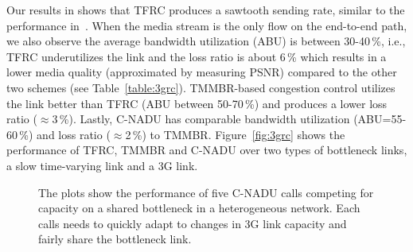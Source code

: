 Our results in  shows that TFRC produces a sawtooth sending
rate, similar to the performance in~\cite{saurin:2006:thesis}. When the media
stream is the only flow on the end-to-end path, we also observe the average
bandwidth utilization (ABU) is between 30-40\,\%, i.e., TFRC underutilizes the
link and the loss ratio is about 6\,\% which results in a lower media quality
(approximated by measuring PSNR) compared to the other two schemes (see
Table~\ref{table:3grc}). TMMBR-based congestion control utilizes the link
better than TFRC (ABU between 50-70\,\%) and produces a lower loss ratio
($\approx$3\,\%). Lastly, C-NADU has comparable bandwidth utilization
(ABU=55-60\,\%) and loss ratio ($\approx$2\,\%) to TMMBR.
Figure~\ref{fig:3grc} shows the performance of TFRC, TMMBR and C-NADU over two
types of bottleneck links, a slow time-varying link and a 3G link.


\begin{figure}[!t]
\centerline{
{}
{}
}
\centerline{
{}
{}
}
\caption{The plots show the performance of five C-NADU calls competing for
capacity on a shared bottleneck in a heterogeneous network. Each calls needs
to quickly adapt to changes in 3G link capacity and fairly share the
bottleneck link.}
\label{fig:hetrc}
\end{figure}

\begin{table}[!t]
\caption{C-NADU: Five calls in a heterogeneous network with end-to-end latency
between \emph{60-120ms} and 0.5\% link-layer losses.}
\label{table:hetrc}
\end{table}

